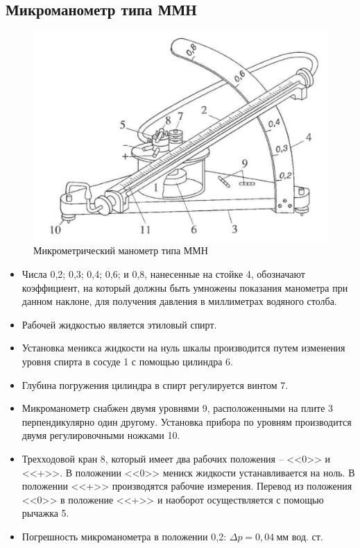 \documentclass[a4paper,12pt]{article}
\theoremstyle{plain} %
\theoremstyle{definition} %
\theoremstyle{remark} %
\begin{document}
\subsection{Микроманометр типа ММН}
\begin{figure}[h]
	\begin{center}
		\includegraphics[width=0.5\linewidth]{3}
		\caption{Микрометрический манометр типа ММН}
	\end{center}
\end{figure}
\begin{itemize}

\item Числа 0,2; 0,3; 0,4; 0,6; и 0,8, нанесенные на стойке 4, обозначают коэффициент, на который должны быть умножены показания манометра при данном наклоне, для получения давления в миллиметрах водяного столба.
\item Рабочей жидкостью является этиловый спирт.
\item Установка меникса жидкости на нуль шкалы производится путем изменения уровня спирта в сосуде 1 с помощью цилиндра 6.
\item Глубина погружения цилиндра в спирт регулируется винтом 7.
\item Микроманометр снабжен двумя уровнями 9, расположенными на плите 3 перпендикулярно один другому. Установка прибора по уровням производится двумя регулировочными ножками 10.
\item Трехходовой кран 8, который имеет два рабочих положения -- <<0>> и <<+>>. В положении <<0>> мениск жидкости устанавливается на ноль. В положении <<+>> производятся рабочие измерения. Перевод из положения <<0>> в положение <<+>> и наоборот осуществляется с помощью рычажка 5.
\item Погрешность микроманометра в положении 0,2: $\Delta p = 0,04 \ \text{мм вод. ст.}$
\end{itemize}
\end{document}
